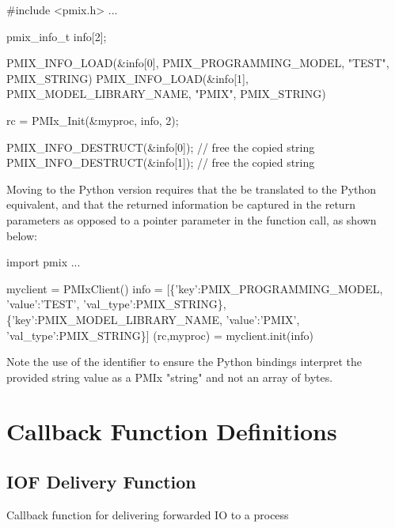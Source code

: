 \cspecificstart
\begin{codepar}

#include <pmix.h>
...

pmix_info_t info[2];

PMIX_INFO_LOAD(&info[0], PMIX_PROGRAMMING_MODEL, "TEST", PMIX_STRING)
PMIX_INFO_LOAD(&info[1], PMIX_MODEL_LIBRARY_NAME, "PMIX", PMIX_STRING)

rc = PMIx_Init(&myproc, info, 2);

PMIX_INFO_DESTRUCT(&info[0]);  // free the copied string
PMIX_INFO_DESTRUCT(&info[1]);  // free the copied string
\end{codepar}
\cspecificend

Moving to the Python version requires that the  be translated to the Python  equivalent, and that the returned information be captured in the return parameters as opposed to a pointer parameter in the function call, as shown below:

\pyspecificstart
\begin{codepar}
import pmix
...

myclient = PMIxClient()
info = [\{'key':PMIX_PROGRAMMING_MODEL,
          'value':'TEST', 'val_type':PMIX_STRING\},
        \{'key':PMIX_MODEL_LIBRARY_NAME,
          'value':'PMIX', 'val_type':PMIX_STRING\}]
(rc,myproc) = myclient.init(info)
\end{codepar}
\pyspecificend

Note the use of the  identifier to ensure the Python bindings interpret the provided string value as a \ac{PMIx} "string" and not an array of bytes.


\section{Callback Function Definitions}
\label{app:python:fns}

\subsection{IOF Delivery Function}

\summary

Callback function for delivering forwarded \ac{IO} to a process

\format


